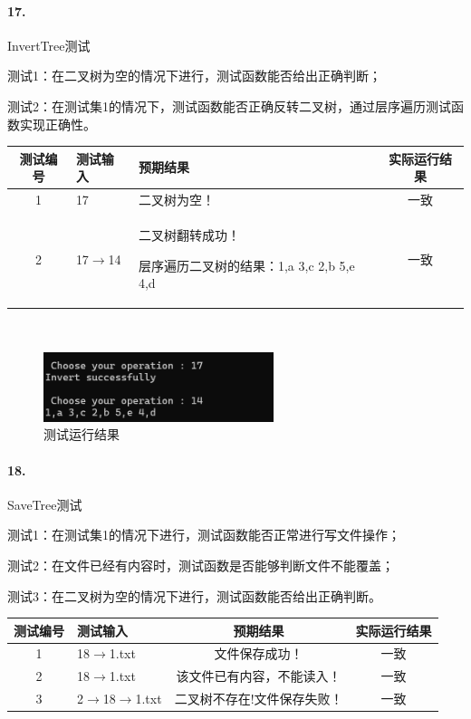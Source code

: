 \documentclass[supercite]{Experimental_Report}
\theoremstyle{definition}
\begin{document}
\paragraph{17.}InvertTree测试

测试1：在二叉树为空的情况下进行，测试函数能否给出正确判断；

测试2：在测试集1的情况下，测试函数能否正确反转二叉树，通过层序遍历测试函数实现正确性。

\vspace{0.5em}

\begin{tabular}{|c|p{2.7cm}|p{6cm}|c|}
	\hline
	测试编号 & 测试输入 & 预期结果 & 实际运行结果 \\
	\hline
	1 & 17 & 二叉树为空！ & 一致 \\
	\hline
	2 & 17$\rightarrow$14 & 二叉树翻转成功！

层序遍历二叉树的结果：1,a 3,c 2,b 5,e 4,d & 一致 \\
	\hline
\end{tabular}

~\

\begin{figure}[H]
 	\centering
 	\includegraphics[width=0.6\textwidth]{images/二叉树测试17.png}
 	\caption{测试运行结果}
 	\label{txlab}
 \end{figure}

\paragraph{18.}SaveTree测试

测试1：在测试集1的情况下进行，测试函数能否正常进行写文件操作；

测试2：在文件已经有内容时，测试函数是否能够判断文件不能覆盖；

测试3：在二叉树为空的情况下进行，测试函数能否给出正确判断。

\vspace{0.5em}

\begin{tabular}{|c|p{2.7cm}|c|c|}
	\hline
	测试编号 & 测试输入 & 预期结果 & 实际运行结果 \\
	\hline
	1 & 18$\rightarrow$1.txt & 文件保存成功！ & 一致 \\
	\hline
	2 & 18$\rightarrow$1.txt & 该文件已有内容，不能读入！ & 一致 \\
	\hline
	3 & 2$\rightarrow$18$\rightarrow$1.txt & 二叉树不存在!文件保存失败！ & 一致 \\
	\hline
\end{tabular}
\end{document}
